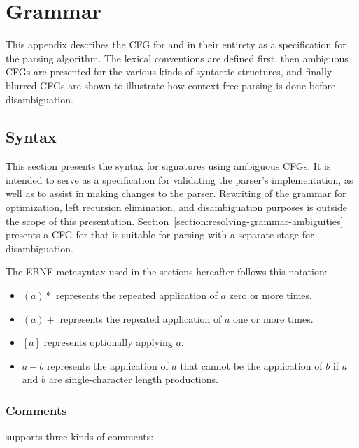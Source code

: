 \chapter{\Beluga Grammar}

This appendix describes the \ac{CFG} for \Beluga and \Harpoon in their entirety as a specification for the parsing algorithm.
The lexical conventions are defined first, then ambiguous \acp{CFG} are presented for the various kinds of syntactic structures, and finally blurred \acp{CFG} are shown to illustrate how context-free parsing is done before disambiguation.

\section{Syntax}\label{section:syntax}

This section presents the syntax for \Beluga signatures using ambiguous \acp{CFG}.
It is intended to serve as a specification for validating the parser's implementation, as well as to assist in making changes to the parser.
Rewriting of the grammar for optimization, left recursion elimination, and disambiguation purposes is outside the scope of this presentation.
Section~\ref{section:resolving-grammar-ambiguities} presents a \ac{CFG} for \Beluga that is suitable for parsing with a separate stage for disambiguation.

The \ac{EBNF} metasyntax used in the sections hereafter follows this notation:

\begin{itemize}
\item $ (a)* $ represents the repeated application of $ a $ zero or more times.
\item $ (a)+ $ represents the repeated application of $ a $ one or more times.
\item $ [a] $ represents optionally applying $ a $.
\item $ a - b $ represents the application of $ a $ that cannot be the application of $ b $ if $ a $ and $ b $ are single-character length productions.
\end{itemize}

\subsection{Comments}\label{section:comments-lexical-convention}

\Beluga supports three kinds of comments:

